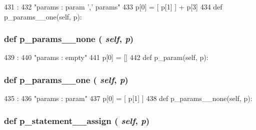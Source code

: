 \begin{DoxyVerb}
\begin{DoxyCode}
431                                :
432         "params : param ',' params"
433         p[0] = [ p[1] ] + p[3]
434 
    def p_params__one(self, p):
\end{DoxyCode}
\hypertarget{classslicc_1_1parser_1_1SLICC_ac0fdd46e2f1e3780cacfa11ef4facf02}{
\subsubsection[{p\_\-params\_\-\_\-none}]{\setlength{\rightskip}{0pt plus 5cm}def p\_\-params\_\-\_\-none ( {\em self}, \/   {\em p})}}
\label{classslicc_1_1parser_1_1SLICC_ac0fdd46e2f1e3780cacfa11ef4facf02}



\begin{DoxyCode}
439                                :
440         "params : empty"
441         p[0] = []
442 
    def p_param(self, p):
\end{DoxyCode}
\hypertarget{classslicc_1_1parser_1_1SLICC_a4a9b0ea44fb9a558f4d63f9a688ecfd6}{
\subsubsection[{p\_\-params\_\-\_\-one}]{\setlength{\rightskip}{0pt plus 5cm}def p\_\-params\_\-\_\-one ( {\em self}, \/   {\em p})}}
\label{classslicc_1_1parser_1_1SLICC_a4a9b0ea44fb9a558f4d63f9a688ecfd6}



\begin{DoxyCode}
435                               :
436         "params : param"
437         p[0] = [ p[1] ]
438 
    def p_params__none(self, p):
\end{DoxyCode}
\hypertarget{classslicc_1_1parser_1_1SLICC_a7b64a5e27ad61d766e32b878ff3217b1}{
\subsubsection[{p\_\-statement\_\-\_\-assign}]{\setlength{\rightskip}{0pt plus 5cm}def p\_\-statement\_\-\_\-assign ( {\em self}, \/   {\em p})}}
\label{classslicc_1_1parser_1_1SLICC_a7b64a5e27ad61d766e32b878ff3217b1}




\end{DoxyVerb}
